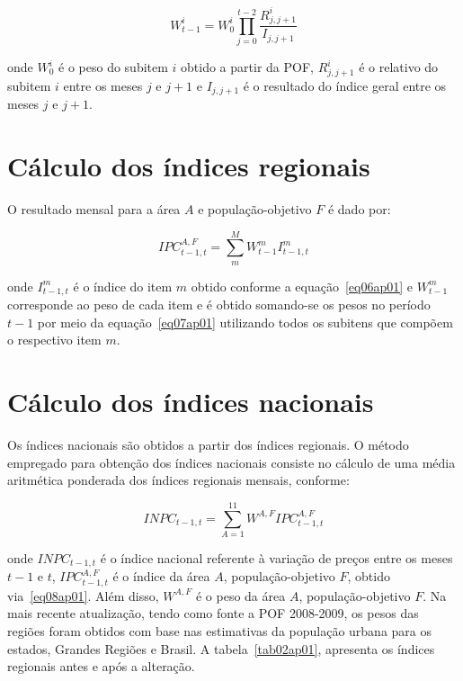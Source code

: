 \documentclass[twoside,a4paper,11pt]{report}
\begin{document}
{\begin{equation}\label{eq07ap01}
{W}_{t-1}^{i}={W}_{0}^{i}\prod_{j=0}^{t-2}{\frac{{R}_{j,j+1}^{i}}{{I}_{j,j+1}}} 
\end{equation}

\noindent onde ${W}_{0}^{i}$ é o peso do subitem $i$ obtido a partir da POF, ${R}_{j,j+1}^{i}$ é o relativo do subitem $i$ entre os meses $j$ e $j+1$ e ${I}_{j,j+1}$ é o resultado do índice geral entre os meses $j$ e $j+1$.

\section*{Cálculo dos índices regionais}

O resultado mensal para a área $A$ e população-objetivo $F$ é dado por:

\begin{equation}\label{eq08ap01}
{IPC}_{t-1,t}^{A,F}=\sum_{m}^{M}{{W}_{t-1}^{m}{I}_{t-1,t}^{m}} 
\end{equation}

\noindent onde ${I}_{t-1,t}^{m}$ é o índice do item $m$ obtido conforme a equação~\ref{eq06ap01} e ${W}_{t-1}^{m}$ corresponde ao peso de cada item e é obtido somando-se os pesos no período $t-1$ por meio da equação~\ref{eq07ap01} utilizando todos os subitens que compõem o respectivo item $m$.

\section*{Cálculo dos índices nacionais}

Os índices nacionais são obtidos a partir dos índices regionais. O método empregado para obtenção dos índices nacionais consiste no cálculo de uma média aritmética ponderada dos índices regionais mensais, conforme:

\begin{equation}\label{eq09ap01}
{INPC}_{t-1,t}=\sum_{A=1}^{11}{{W}^{A,F}{IPC}_{t-1,t}^{A,F}}
\end{equation}

\noindent onde ${INPC}_{t-1,t}$ é o índice nacional referente à variação de preços entre os meses $t-1$ e $t$, ${IPC}_{t-1,t}^{A,F}$ é o índice da área $A$, população-objetivo $F$, obtido via~\ref{eq08ap01}. Além disso, ${W}^{A,F}$ é o peso da área $A$, população-objetivo $F$. Na mais recente atualização, tendo como fonte a POF 2008-2009, os pesos das regiões foram obtidos com base nas estimativas da população urbana para os estados, Grandes Regiões e Brasil. A tabela~\ref{tab02ap01}, apresenta os índices regionais antes e após a alteração. 

}
\end{document}
